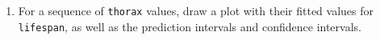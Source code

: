\documentclass[12pt,letterpaper]{article}
\begin{document}
\begin{enumerate}
	\item	For a sequence of \texttt{thorax} values, draw a plot with their fitted values for \texttt{lifespan}, as well as the prediction intervals and confidence intervals.



\end{enumerate}
\end{document}
